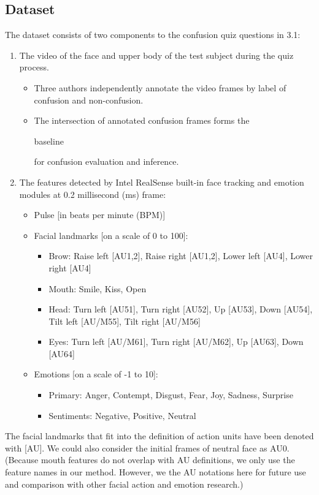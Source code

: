 \documentclass[12pt,letterpaper]{article}
\begin{document}
\subsection{Dataset}

The dataset consists of two components to the confusion quiz questions in 3.1: 
\begin{enumerate}
\item The video of the face and upper body of the test subject during the quiz process.
\begin{itemize}
\item Three authors independently annotate the video frames by label of confusion and non-confusion. 
\item The intersection of annotated confusion frames forms the \begin{bf}baseline\end{bf} for confusion evaluation and inference.
\end{itemize}

\item The features detected by Intel RealSense built-in face tracking and emotion modules at 0.2 millisecond (ms) frame:
\begin{itemize}
\item Pulse [in beats per minute (BPM)]
\item Facial landmarks [on a scale of 0 to 100]: 
\begin{itemize}
\item Brow: Raise left [AU1,2], Raise right [AU1,2], Lower left [AU4], Lower right [AU4]
\item Mouth: Smile, Kiss, Open
\item Head: Turn left [AU51], Turn right [AU52], Up [AU53], Down [AU54], Tilt left [AU/M55], Tilt right [AU/M56]
\item Eyes: Turn left [AU/M61], Turn right [AU/M62], Up [AU63], Down [AU64]
\end{itemize}

\item Emotions [on a scale of -1 to 10]: 
\begin{itemize}
\item Primary: Anger, Contempt, Disgust, Fear, Joy, Sadness, Surprise
\item Sentiments: Negative, Positive, Neutral
\end{itemize}
\end{itemize}
\end{enumerate}

The facial landmarks that fit into the definition of action units have been denoted with [AU]. We could also consider the initial frames of neutral face as AU0. (Because mouth features do not overlap with AU definitions, we only use the feature names in our method. However, we the AU notations here for future use and comparison with other facial action and emotion research.)
\end{document}
